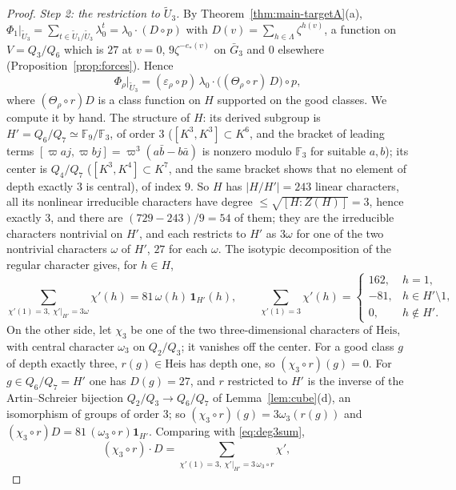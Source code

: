 \documentclass[11pt]{article}
\newcommand{\Fq}{\mathbb F}
\newcommand{\tU}{\widetilde U}
\theoremstyle{plain}
\theoremstyle{definition}
\begin{document}
\begin{proof}
\emph{Step 2: the restriction to $\tU_3$.}  By
Theorem~\ref{thm:main-targetA}(a), $\Phi_1|_{\tU_3}=\sum_{t\in\tU_1/\tU_3}\lambda_0^t=\lambda_0\cdot(D\circ p)$
with $D(v)=\sum_{h\in\Lambda}\zeta^{h(v)}$, a function on $V=Q_3/Q_6$
which is $27$ at $v=0$, $9\zeta^{-e_*(v)}$ on $\bar G_3$ and $0$
elsewhere (Proposition~\ref{prop:forces}).  Hence
\[
 \Phi_\rho|_{\tU_3}=(\varepsilon_\rho\circ p)\,\lambda_0\cdot\bigl((\Theta_\rho\circ r)\,D\bigr)\circ p ,
\]
where $(\Theta_\rho\circ r)D$ is a class function on $H$ supported on
the good classes.  We compute it by hand.  The structure of $H$: its
derived subgroup is $H'=Q_6/Q_7\simeq\Fq_9/\Fq_3$, of order $3$
($[K^3,K^3]\subset K^6$, and the bracket of leading terms
$[\varpi aj,\varpi bj]=\varpi^3(a\bar b-b\bar a)$ is nonzero modulo
$\Fq_3$ for suitable $a,b$); its center is $Q_4/Q_7$
($[K^3,K^4]\subset K^7$, and the same bracket shows that no element of
depth exactly $3$ is central), of index $9$.  So $H$ has $|H/H'|=243$
linear characters, all its nonlinear irreducible characters have degree
$\le\sqrt{[H:Z(H)]}=3$, hence exactly $3$, and there are $(729-243)/9=54$
of them; they are the irreducible characters nontrivial on $H'$, and
each restricts to $H'$ as $3\omega$ for one of the two nontrivial
characters $\omega$ of $H'$, $27$ for each $\omega$.  The isotypic
decomposition of the regular character gives, for $h\in H$,
\begin{equation}\label{eq:deg3sum}
 \sum_{\chi'(1)=3,\ \chi'|_{H'}=3\omega}\chi'(h)=81\,\omega(h)\,\mathbf 1_{H'}(h),\qquad
 \sum_{\chi'(1)=3}\chi'(h)=\begin{cases}162,&h=1,\\-81,&h\in H'\setminus1,\\0,&h\notin H'.\end{cases}
\end{equation}
On the other side, let $\chi_3$ be one of the two three-dimensional
characters of $\mathrm{Heis}$, with central character $\omega_3$ on
$Q_2/Q_3$; it vanishes off the center.  For a good class $g$ of depth
exactly three, $r(g)\in\mathrm{Heis}$ has depth one, so
$(\chi_3\circ r)(g)=0$.  For $g\in Q_6/Q_7=H'$ one has $D(g)=27$, and
$r$ restricted to $H'$ is the inverse of the Artin--Schreier bijection
$Q_2/Q_3\to Q_6/Q_7$ of Lemma~\ref{lem:cube}(d), an isomorphism of
groups of order $3$; so $(\chi_3\circ r)(g)=3\omega_3(r(g))$ and
$(\chi_3\circ r)D=81\,(\omega_3\circ r)\mathbf 1_{H'}$.  Comparing with
\eqref{eq:deg3sum},
\begin{equation}\label{eq:chi3D}
 (\chi_3\circ r)\cdot D=\sum_{\chi'(1)=3,\ \chi'|_{H'}=3\,\omega_3\circ r}\chi',\qquad

\end{equation}
\end{proof}
\end{document}
